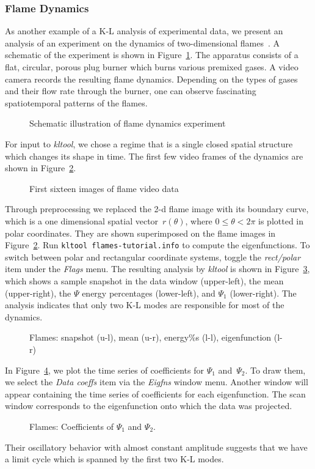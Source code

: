 \subsubsection{Flame Dynamics}
As another  example of a K-L analysis of experimental data, 
we present an analysis of 
an experiment on the dynamics of two-dimensional flames~\cite{gor}.
A schematic of the experiment is shown in Figure~\ref{fig:flames}.
The apparatus consists of a flat, circular, porous plug burner
which burns various premixed gases.  A video camera
records the resulting flame dynamics.  
Depending on the types of gases and
their flow rate through the burner,
one can observe fascinating spatiotemporal patterns of the flames.
\begin{figure}
\caption{Schematic illustration of flame dynamics experiment}
\label{fig:flames}
\end{figure}
For input to {\sl kltool}, we chose a  regime
that is a single closed 
spatial structure
which changes its shape in time.  The first few video frames
of the dynamics are shown in Figure~\ref{fig:images}.
\begin{figure}
\caption{First sixteen images of flame video data}
\label{fig:images}
\end{figure}
Through preprocessing
we replaced the 2-d flame image with its boundary curve,
which is a one dimensional spatial vector~$r(\theta)$, where
$0\leq\theta < 2\pi$ is plotted in polar coordinates. They are 
shown superimposed on the flame images in Figure~\ref{fig:images}.
Run {\tt kltool flames-tutorial.info} to compute the eigenfunctions. 
To switch between polar and rectangular coordinate systems, toggle the
{\sl rect/polar} item under the {\sl Flags} menu.
The resulting analysis by {\sl kltool} is shown in
Figure~\ref{fig:flamesnap}, which shows a sample snapshot
in the data window (upper-left), the
mean (upper-right), the $\Psi$ energy percentages (lower-left), and $\Psi_1$
(lower-right).  The analysis indicates that only two K-L modes are
responsible for most of the dynamics. 
\begin{figure}
\caption{Flames: snapshot (u-l), mean  (u-r), energy\%s (l-l),
	eigenfunction (l-r)}
\label{fig:flamesnap}
\end{figure} 
In Figure~\ref{fig:coeffs}, we plot the time series of
coefficients for $\Psi_1$ and~$\Psi_2$.  To draw them,
we select the {\sl Data coeffs}
item via the {\sl Eigfns} window menu.  Another window will appear containing
the time series of coefficients for each eigenfunction.  The scan window
corresponds to the eigenfunction onto which the data was projected.
\begin{figure}
\caption{Flames: Coefficients of $\Psi_1$ and $\Psi_2$.}
\label{fig:coeffs}
\end{figure}
Their oscillatory behavior with almost constant amplitude suggests
that we have a
limit cycle which is spanned by the first two K-L modes.
%

